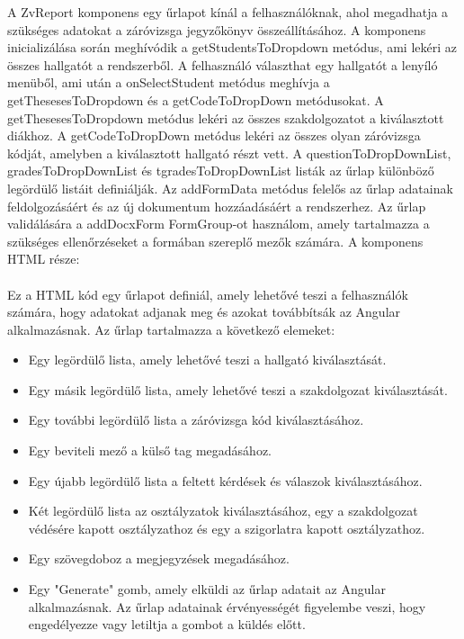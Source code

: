 A ZvReport komponens egy űrlapot kínál a felhasználóknak, ahol megadhatja a szükséges adatokat a záróvizsga jegyzőkönyv összeállításához. A komponens inicializálása során meghívódik a getStudentsToDropdown metódus, ami lekéri az összes hallgatót a rendszerből. A felhasználó választhat egy hallgatót a lenyíló menüből, ami után a onSelectStudent metódus meghívja a getThesesesToDropdown és a getCodeToDropDown metódusokat. A getThesesesToDropdown metódus lekéri az összes szakdolgozatot a kiválasztott diákhoz. A getCodeToDropDown metódus lekéri az összes olyan záróvizsga kódját, amelyben a kiválasztott hallgató részt vett. A questionToDropDownList, gradesToDropDownList és tgradesToDropDownList listák az űrlap különböző legördülő listáit definiálják. Az addFormData metódus felelős az űrlap adatainak feldolgozásáért és az új dokumentum hozzáadásáért a rendszerhez. Az űrlap validálására a addDocxForm FormGroup-ot használom, amely tartalmazza a szükséges ellenőrzéseket a formában szereplő mezők számára.
\newpage
A komponens HTML része:\\
\\
Ez a HTML kód egy űrlapot definiál, amely lehetővé teszi a felhasználók számára, hogy adatokat adjanak meg és azokat továbbítsák az Angular alkalmazásnak. Az űrlap tartalmazza a következő elemeket:

\begin{itemize}

\item{}Egy legördülő lista, amely lehetővé teszi a hallgató kiválasztását.
\item{}Egy másik legördülő lista, amely lehetővé teszi a szakdolgozat kiválasztását.
\item{}Egy további legördülő lista a záróvizsga kód kiválasztásához.
\item{}Egy beviteli mező a külső tag megadásához.
\item{}Egy újabb legördülő lista a feltett kérdések és válaszok kiválasztásához.
\item{}Két legördülő lista az osztályzatok kiválasztásához, egy a szakdolgozat védésére kapott osztályzathoz és egy a szigorlatra kapott osztályzathoz.
\item{}Egy szövegdoboz a megjegyzések megadásához.
\item{}Egy "Generate" gomb, amely elküldi az űrlap adatait az Angular alkalmazásnak. Az űrlap adatainak érvényességét figyelembe veszi, hogy engedélyezze vagy letiltja a gombot a küldés előtt.

\end{itemize}